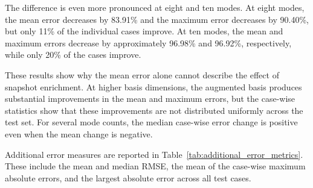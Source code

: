 The difference is even more pronounced at eight
and ten modes. At eight modes, the mean error
decreases by 83.91\% and the maximum error decreases
by 90.40\%, but only 11\% of the individual cases
improve. At ten modes, the mean and maximum errors
decrease by approximately 96.98\% and 96.92\%,
respectively, while only 20\% of the cases improve.

These results show why the mean error alone cannot
describe the effect of snapshot enrichment. At higher
basis dimensions, the augmented basis produces
substantial improvements in the mean and maximum
errors, but the case-wise statistics show that these
improvements are not distributed uniformly across
the test set. For several mode counts, the median
case-wise error change is positive even when the
mean change is negative.

Additional error measures are reported in
Table~\ref{tab:additional_error_metrics}. These include
the mean and median RMSE, the mean of the case-wise
maximum absolute errors, and the largest absolute
error across all test cases.

